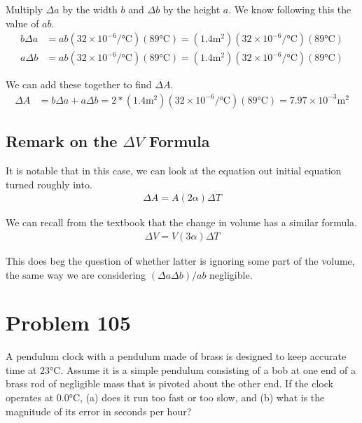 \documentclass[12pt]{article}
\begin{document}
            Multiply $\Delta a$ by the width $b$ and $\Delta b$ by the height $a$. 
            We know following this the value of $ab$.
            \begin{align}
                b \Delta a  &=  ab (32 \times 10^{-6} /\unit{\celsius}) (89 \unit{\celsius})
                    =   (1.4 \unit{\meter^2}) (32 \times 10^{-6} /\unit{\celsius}) (89 \unit{\celsius})\\
                a \Delta b  &=  ab (32 \times 10^{-6} /\unit{\celsius}) (89 \unit{\celsius})
                    =   (1.4 \unit{\meter^2}) (32 \times 10^{-6} /\unit{\celsius}) (89 \unit{\celsius})
            \end{align}

            We can add these together to find $\Delta A$.
            \begin{align}
                \Delta A    &=  b \Delta a + a \Delta b
                    =   2 * (1.4 \unit{\meter^2}) (32 \times 10^{-6} /\unit{\celsius}) (89 \unit{\celsius})
                    =   \boxed{7.97 \times 10^{-3} \unit{\meter^2}}
            \end{align}
        
        \subsection{Remark on the $\Delta V$ Formula}
            It is notable that in this case, we can look at the equation out initial equation turned roughly into.
            \begin{gather}
                \Delta A    =   A (2\alpha) \Delta T
            \end{gather}

            We can recall from the textbook that the change in volume has a similar formula.
            \begin{gather}
                \Delta V    =   V (3\alpha) \Delta T
            \end{gather}

            This does beg the question of whether latter is ignoring some part of the volume, the same way we are considering $(\Delta a \Delta b)/ab$ negligible. 
            

    \pagebreak
    \section{Problem 105}
        A pendulum clock with a pendulum made of brass is designed to keep accurate time at 23°C. 
        Assume it is a simple pendulum consisting of a bob at one end of a brass rod of negligible mass that is pivoted about the other end. 
        If the clock operates at 0.0°C, (a) does it run too fast or too slow, and (b) what is the magnitude of its error in seconds per hour?
\end{document}
